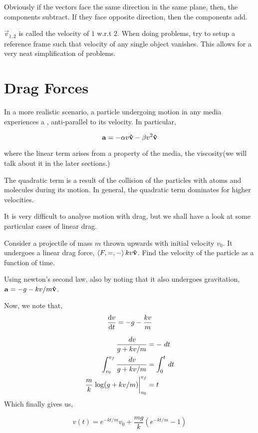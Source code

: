 Obviously if the vectors face the same direction in the same plane, then, the components subtract. If they face
opposite direction, then the components add. 

\(\vec{v}_{1,2}\) is called the velocity of \(\mathit{1}\) w.r.t \(\mathit{2}\). When doing
problems, try to setup a reference frame such that velocity of any single object vanishes.
This allows for a very neat simplification of problems. 

\section{Drag Forces}

In a more realistic scenario, a particle undergoing motion in any 
media experiences a , anti-parallel to its velocity.
In particular,  

\begin{equation*}
    \boldsymbol{\mathbf{a}} = -\alpha v \boldsymbol{\mathbf{\hat{v}}} - \beta v^2 \boldsymbol{\mathbf{\hat{v}}}
\end{equation*}

where the linear term arises from a property of the media, 
the viscosity(we will talk about it in the later sections.)

The quadratic term is a result of the collision of the particles with atoms 
and molecules during its motion. In general, 
the quadratic term dominates for higher velocities.

It is very difficult to analyse motion with drag, but we shall have a look at some particular 
cases of linear drag.


\begin{example}
    Consider a projectile of mass \(m\) thrown upwards with initial velocity \(v_0\). It undergoes a linear drag 
    force, \(\left\langle F, =, -\right\rangle kv \boldsymbol{\mathbf{\hat{v}}}\). Find the velocity of the particle as 
    a function of time. 
    \begin{soln}
        Using newton's second law, also by noting that 
        it also undergoes gravitation, \(\boldsymbol{\mathbf{a}} = -g -kv/m \boldsymbol{\mathbf{\hat{v}}}\).

        Now, we note that, 
        \begin{equation*}
            \dv{v}{t} = -g  - \frac{kv}{m}
        \end{equation*}

        \begin{align*}
            \frac{\dd{v}}{g + kv/m} &= - \dd{t} \\
            \int_{v_0}^{v_f} \frac{\dd{v}}{g + kv/m} &= \int_{0}^{t}\dd{t} \\
            \frac{m}{k} \eval{\log(g + kv/m)}_{v_0}^{v_f} &= t \\
        \end{align*}
        Which finally gives us,

        \begin{equation}
            v(t) = e^{-kt/m}v_0 + \frac{mg}{k}(e^{-kt/m} - 1)
        \end{equation}

    \end{soln}
\end{example}

